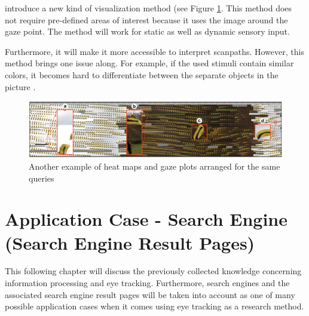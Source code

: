 \textcite[]{kurzhals2016gaze} introduce a new kind of visualization method (see Figure \ref{figure:GazeStripes}. This method does not require pre-defined areas of interest because it uses the image around the gaze point. The method will work for static as well as dynamic sensory input. 

Furthermore, it will make it more accessible to interpret scanpaths. However, this method brings one issue along. For example, if the used stimuli contain similar colors, it becomes hard to differentiate between the separate objects in the picture \autocite[]{kurzhals2016gaze}.

\begin{figure}[!ht]
    \centering
    \includegraphics[width=1\linewidth]{images/GazeStripes_kurzhals2016gaze.png}
    \caption{
       Another example of heat maps and gaze plots  arranged for the same queries \autocite[1005]{kurzhals2016gaze}
    }
    \label{figure:GazeStripes}
\end{figure}


\section{Application Case - Search Engine (Search Engine Result Pages)}
\label{section:SearchEngine}
This following chapter will discuss the previously collected knowledge concerning information processing and eye tracking. Furthermore, search engines and the associated search engine result pages will be taken into account as one of many possible application cases when it comes using eye tracking as a research method.

